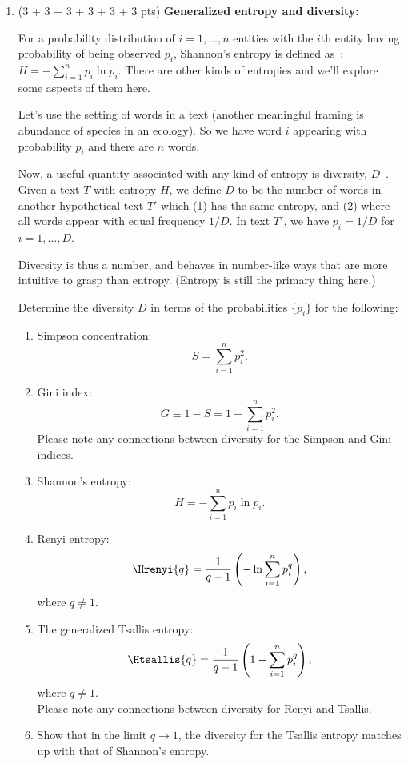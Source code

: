 \begin{enumerate}
\item (3 + 3 + 3 + 3 + 3 + 3 pts)
  \textbf{Generalized entropy and diversity:}

  For a probability distribution of $i=1, \ldots , n$ 
  entities 
  with the $i$th entity having probability of
  being observed $p_{i}$,
  Shannon's entropy is defined as~\cite{shannon1948a}:
  $
  H 
  = 
  - \sum_{i=1}^{n} 
  p_{i} \ln p_{i}.
  $
  There are other kinds of entropies and we'll
  explore some aspects of them here.
  
  Let's use the setting of words in a text
  (another meaningful framing is abundance of species
  in an ecology).
  So we have word $i$ appearing with probability $p_{i}$
  and there are $n$ words.

  Now, a useful quantity associated with any kind of 
  entropy is diversity, $D$~\cite{jost2006a}.
  Given a text $T$ with entropy $H$, we define
  $D$ to be the number of words in another hypothetical text $T'$
  which 
  (1) has the same entropy,
  and 
  (2) where all words appear with equal frequency $1/D$.
  In text $T'$, we have $p_{i}=1/D$ for $i=1, \ldots,D$.

  Diversity is thus a number, and behaves in number-like 
  ways that are more intuitive to grasp than entropy.
  (Entropy is still the primary thing here.)
  
  Determine the diversity $D$ in terms
  of the probabilities $\{p_{i}\}$ for the following:
  \begin{enumerate}
  \item 
    Simpson concentration: 
    $$ 
    S = \sum_{i=1}^{n} p_{i}^{2}.
    $$ 
  \item 
    Gini index: 
    $$ 
    G \equiv 1 - S = 1 - \sum_{i=1}^{n} p_{i}^{2}.
    $$ 
    Please note any connections between diversity
    for the Simpson and Gini indices. 
  \item 
    Shannon's entropy:
    $$
    H 
    = 
    - \sum_{i=1}^{n} 
    p_{i} \ln p_{i}.
    $$
  \item 
    Renyi entropy:
    $$
    \Hrenyi{q}
    =
    \frac{1}{q-1}
    \left(
    - 
    \ln 
    \sum_{i=1}^{n} p_{i}^{q}
    \right),
    $$
    where $q \ne 1$.
  \item 
    The generalized Tsallis entropy:
    $$
    \Htsallis{q}
    =
    \frac{1}{q-1}
    \left(
    1 - \sum_{i=1}^{n} p_{i}^{q}
    \right),
    $$
    where $q \ne 1$.\\
    Please note any connections between diversity
    for Renyi and Tsallis.
  \item 
    Show that in the limit $q \rightarrow 1$,
    the diversity for the Tsallis entropy
    matches up with that of Shannon's entropy.
  \end{enumerate}


\end{enumerate}
